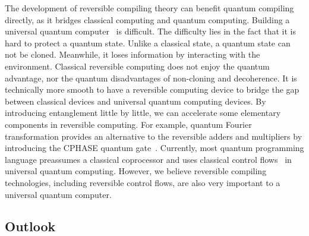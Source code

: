 \documentclass{article}
\newcommand{\<}{\langle}
\renewcommand{\>}{\rangle}
\theoremstyle{definition}\newtheorem{definition}{\textit{Definition}}
\begin{document}
The development of reversible compiling theory can benefit quantum compiling~\cite{Chong2017} directly, as it bridges classical computing and quantum computing.
Building a universal quantum computer~\cite{Nielsen2002} is difficult. 
The difficulty lies in the fact that it is hard to protect a quantum state.
Unlike a classical state, a quantum state can not be cloned. Meanwhile, it loses information by interacting with the environment.
Classical reversible computing does not enjoy the quantum advantage, nor the quantum disadvantages of non-cloning and decoherence.
It is technically more smooth to have a reversible computing device to bridge the gap between classical devices and universal quantum computing devices.
By introducing entanglement little by little, we can accelerate some elementary components in reversible computing. For example, quantum Fourier transformation provides an alternative to the reversible adders and multipliers by introducing the CPHASE quantum gate~\cite{RuizPerez2017}.
Currently, most quantum programming language preassumes a classical coprocessor and uses classical control flows~\cite{Svore2018} in universal quantum computing.
However, we believe reversible compiling technologies, including reversible control flows, are also very important to a universal quantum computer.

\subsection{Outlook}\label{sec:outlook}
\end{document}
